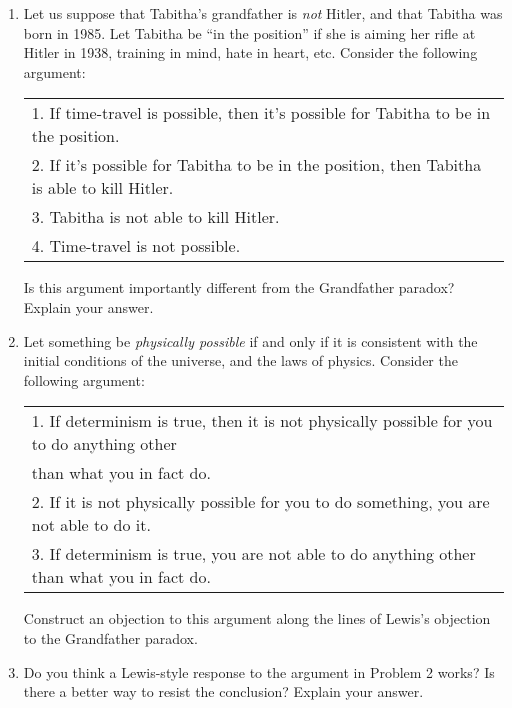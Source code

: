 \documentclass[12pt,a4paper]{article}
\begin{document}
\begin{enumerate}

\item Let us suppose that Tabitha's grandfather is \emph{not} Hitler, and that Tabitha was born in 1985. Let Tabitha be ``in the position'' if she is aiming her rifle at Hitler in 1938, training in mind, hate in heart, etc. Consider the following argument:
\begin{center}
\begin{tabular}{l}
1. If time-travel is possible, then it's possible for Tabitha to be in the position.\\
2. If it's possible for Tabitha to be in the position, then Tabitha is able to kill Hitler.\\
3. Tabitha is not able to kill Hitler.\\ \hline
4. Time-travel is not possible.
\end{tabular}
\end{center}

Is this argument importantly different from the Grandfather paradox? Explain your answer. 

\item Let something be \textsl{physically possible} if and only if it is consistent with the initial conditions of the universe, and the laws of physics. Consider the following argument:
\begin{center}
\begin{tabular}{l}
1. If determinism is true, then it is not physically possible for you to do anything other\\ \hspace{10mm} than what you in fact do.\\
2. If it is not physically possible for you to do something, you are not able to do it.\\ \hline
3. If determinism is true, you are not able to do anything other than what you in fact do.
\end{tabular}
\end{center}  

Construct an objection to this argument along the lines of Lewis's objection to the Grandfather paradox.

\item Do you think a Lewis-style response to the argument in Problem 2 works? Is there a better way to resist the conclusion? Explain your answer.


\end{enumerate}
\end{document}
